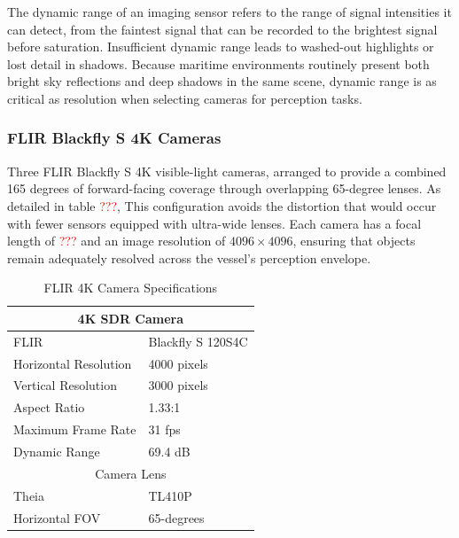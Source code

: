 \documentclass{erauthesis}
\begin{document}
The dynamic range of an imaging sensor refers to the range of signal intensities it can detect, from the faintest signal that can be recorded to the brightest signal before saturation.
Insufficient dynamic range leads to washed-out highlights or lost detail in shadows.  
Because maritime environments routinely present both bright sky reflections and deep shadows in the same scene, dynamic range is as critical as resolution when selecting cameras for perception tasks.  

\subsubsection{FLIR Blackfly S 4K Cameras} \label{sensors_FLIR}

Three FLIR Blackfly S 4K visible-light cameras, arranged to provide a combined 165 degrees of forward-facing coverage through overlapping 65-degree lenses.  
As detailed in table \textcolor{red}{???}, This configuration avoids the distortion that would occur with fewer sensors equipped with ultra-wide lenses.
Each camera has a focal length of \textcolor{red}{???} and an image resolution of $4096 \times 4096$, ensuring that objects remain adequately resolved across the vessel's perception envelope.  
\begin{table}[htbp]
\centering
\caption{FLIR 4K Camera Specifications}
\begin{tabular}{ll}
\hline
\multicolumn{2}{c}{4K SDR Camera}\\
\hline
\hline
FLIR & Blackfly S 120S4C \\
Horizontal Resolution & 4000 pixels \\
Vertical Resolution & 3000 pixels \\
Aspect Ratio & 1.33:1 \\
Maximum Frame Rate & 31 fps \\
Dynamic Range & 69.4 dB \\
\multicolumn{2}{c}{Camera Lens}\\
\hline
Theia & TL410P\\
Horizontal \Ac{FOV} & 65-degrees\\
\hline
\end{tabular}
\label{tab:SDR_camera_specs}
\end{table}
\end{document}
